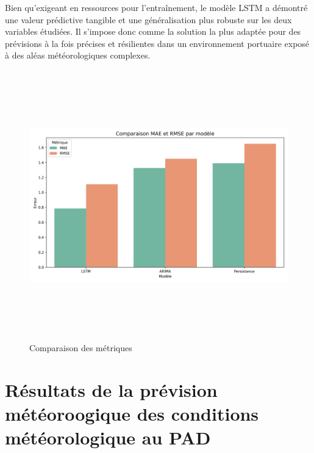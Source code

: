 \documentclass[a4paper,12pt,openany]{report}
\begin{document}
	Bien qu’exigeant en ressources pour l’entraînement, le modèle LSTM a démontré une valeur prédictive tangible et une généralisation plus robuste sur les deux variables étudiées. Il s’impose donc comme la solution la plus adaptée pour des prévisions à la fois précises et résilientes dans un environnement portuaire exposé à des aléas météorologiques complexes.
	\begin{figure}[H]
		\begin{center}
		 \begin{minipage}{\textwidth}
		    \begin{center}
		    \includegraphics[width=1\textwidth,height=4.6in]{images/comparaison_MAE_RMSE.png}
		    \end{center}
		    \end{minipage}
				
			\caption{Comparaison des métriques\label{Fig 3.6}}
		\end{center}
	\end{figure}%
\section{Résultats de la prévision météoroogique des conditions météorologique au PAD}
	
\end{document}
